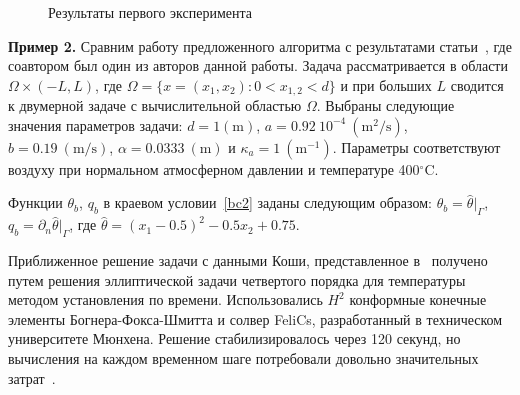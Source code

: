 \documentclass[12pt]{article}
\begin{document}
    \begin{figure}[H]
        \centering
        \caption{Результаты первого эксперимента}
    \end{figure}

    \textbf{Пример 2.}
    Сравним работу предложенного алгоритма с результатами статьи~\cite{CNSNS19},
    где соавтором был один из авторов данной работы.
    Задача рассматривается в области $\Omega \times (-L,L)$,
    где $\Omega = \{ x = (x_1,x_2) \colon 0 < x_{1,2} < d\}$
    и при больших $L$ сводится к двумерной задаче с вычислительной областью $\Omega$.
    Выбраны следующие значения параметров задачи:
    $d = \mathrm{1(m)}$, $a = 0.92~10^{-4}~\mathrm{(m^2/s)}$, $b= 0.19~\mathrm{(m/s)}$,
    $\alpha = 0.0333~\mathrm{(m)}$ и $\kappa_a = 1~\mathrm{(m^{-1})}$.
    Параметры соответствуют воздуху при нормальном атмосферном давлении и температуре 400$^\circ$C\@.

    Функции $\theta_b$, $q_b$ в краевом условии~\eqref{bc2} заданы следующим образом:
    $\theta_b = \widehat{\theta}|_{\Gamma}$, $q_b = \partial_n \widehat{\theta}|_{\Gamma}$, где
    $\widehat{\theta} = (x_1-0.5)^2 - 0.5x_2+0.75$.

    Приближенное решение задачи с данными Коши, представленное в~\cite{CNSNS19}
    получено путем решения эллиптической задачи четвертого
    порядка для температуры методом установления по времени.
    Использовались $H^2$ конформные конечные элементы Богнера-Фокса-Шмитта и
    солвер FeliCs, разработанный в техническом университете Мюнхена.
    Решение стабилизировалось через 120 секунд, но вычисления на каждом временном
    шаге потребовали довольно значительных затрат~\cite{CNSNS19}.
\end{document}
